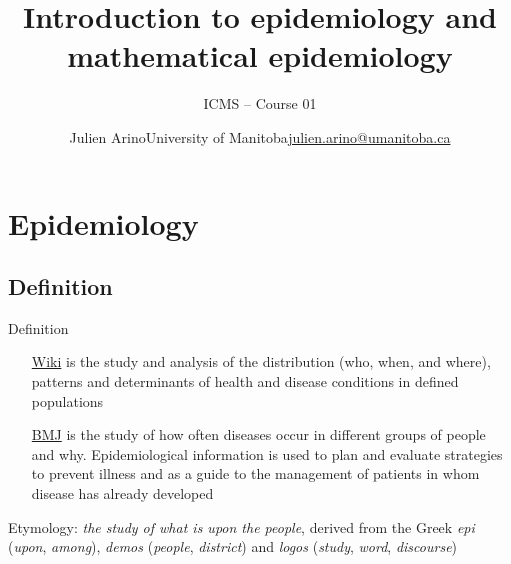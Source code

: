 \documentclass[aspectratio=169]{beamer}\usepackage[]{graphicx}\usepackage[]{xcolor}
\title{Introduction to epidemiology and mathematical epidemiology}
\subtitle{ICMS -- Course 01}
\author{\texorpdfstring{Julien Arino\newline University of Manitoba\newline\url{julien.arino@umanitoba.ca}}{Julien Arino}}
\begin{document}



\section{Epidemiology}

\subsection{Definition}



\begin{frame}{Definition}

\begin{itemize}
    \item[\href{https://en.wikipedia.org/wiki/Epidemiology}{Wiki}] 
     is the study and analysis of the distribution (who, when, and where), patterns and determinants of health and disease conditions in defined populations
    \item[\href{https://www.bmj.com/about-bmj/resources-readers/publications/epidemiology-uninitiated/1-what-epidemiology}{BMJ}]
     is the study of how often diseases occur in different groups of people and why. Epidemiological information is used to plan and evaluate strategies to prevent illness and as a guide to the management of patients in whom disease has already developed 
\end{itemize}
\vfill
Etymology: \emph{the study of what is upon the people}, derived from the Greek \emph{epi} (\emph{upon}, \emph{among}), \emph{demos} (\emph{people}, \emph{district}) and \emph{logos} (\emph{study}, \emph{word}, \emph{discourse})
\end{frame}
\end{document}

